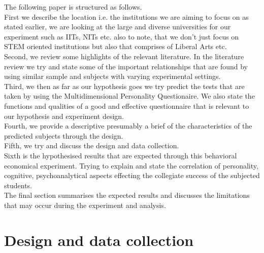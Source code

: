 \documentclass[12pt,a4paper]{article}
\begin{document}
{The following paper is structured as follows.\\
First we describe the location i.e. the institutions we are aiming to focus on as stated earlier, we are looking at the large and diverse universities for our experiment such as IITs, NITs etc. also to note, that we don't just focus on STEM oriented institutions but also that comprises of Liberal Arts etc.\\
Second, we review some highlights of the relevant literature. In the literature review we try and state some of the important relationships that are found by using similar sample and subjects with varying experimental settings.\\
Third, we then as far as our hypothesis goes we try predict the tests that are taken by using the Multidimensional Personality Questionaire. We also state the functions and qualities of a good and effective questionnaire that is relevant to our hypothesis and experiment design.\\
Fourth, we provide a descriptive presumably a brief of the characteristics of the predicted subjects through the design.\\
Fifth, we try and discuss the design and data collection.\\
Sixth is the hypothesised results that are expected through this behavioral economical experiment. Trying to explain and state the correlation of personality, cognitive, psychoanalytical aspects effecting the collegiate success of the subjected students.\\ The final section summarises the expected results and discusses the limitations that may occur during the experiment and analysis.

\section{Design and data collection}

}
\end{document}
